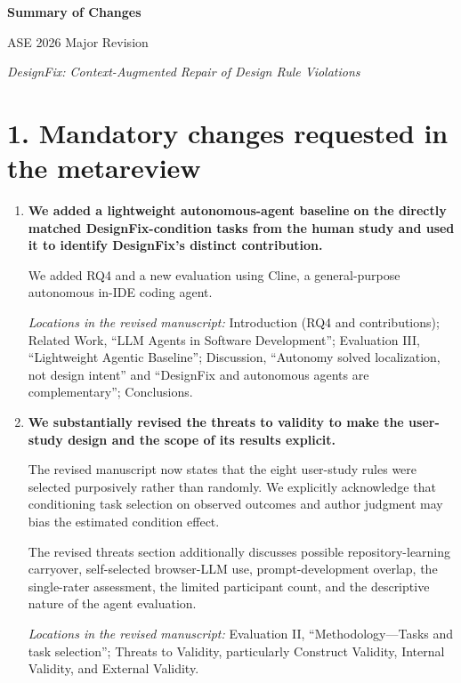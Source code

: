 \documentclass[11pt]{article}
\newcommand{\location}[1]{%
  \par\nobreak\smallskip
  \textit{Locations in the revised manuscript:} #1.
}
\begin{document}
\begin{center}
  {\Large\bfseries Summary of Changes}\par
  \vspace{0.25em}
  {\large ASE 2026 Major Revision}\par
  \vspace{0.15em}
  \textit{DesignFix: Context-Augmented Repair of Design Rule Violations}
\end{center}

\section*{1. Mandatory changes requested in the metareview}

\begin{enumerate}

\item \textbf{We added a lightweight autonomous-agent baseline on the
directly matched DesignFix-condition tasks from the human study and used it to
identify DesignFix's distinct contribution.}

We added RQ4 and a new evaluation using Cline, a general-purpose autonomous
in-IDE coding agent. 

\location{Introduction (RQ4 and contributions); Related Work, ``LLM Agents in
Software Development''; Evaluation III, ``Lightweight Agentic Baseline'';
Discussion, ``Autonomy solved localization, not design intent'' and
``DesignFix and autonomous agents are complementary''; Conclusions}

\item \textbf{We substantially revised the threats to validity to make the
user-study design and the scope of its results explicit.}

The revised manuscript now states that the eight user-study rules were selected
purposively rather than randomly. We explicitly acknowledge that
conditioning task selection on observed outcomes and author judgment may bias
the estimated condition effect.

The revised threats section additionally discusses possible repository-learning
carryover, self-selected browser-LLM use, prompt-development overlap, the
single-rater assessment, the limited participant count, and the descriptive
nature of the agent evaluation.

\location{Evaluation II, ``Methodology---Tasks and task selection''; Threats to
Validity, particularly Construct Validity, Internal Validity, and External
Validity}


\end{enumerate}
\end{document}
